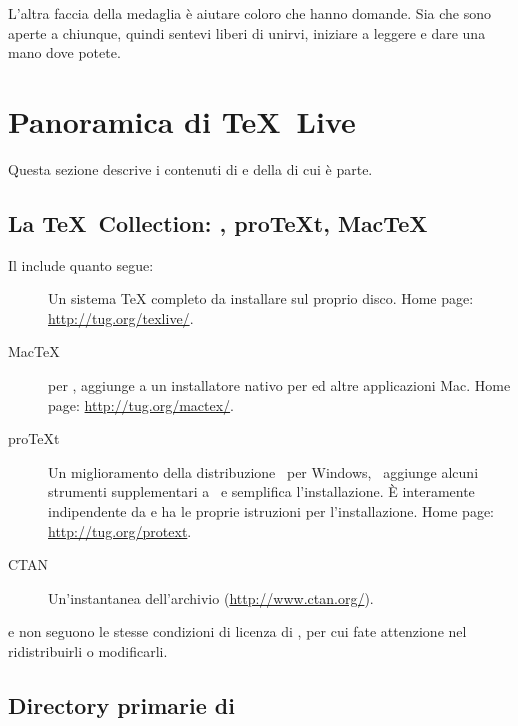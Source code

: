 \documentclass{article}
\begin{document}
L'altra faccia della medaglia è aiutare coloro che hanno domande. Sia
 che  sono aperte a chiunque, quindi
sentevi liberi di unirvi, iniziare a leggere e dare una mano dove potete.

\section{Panoramica di \protect\TeX\protect\ Live}
\label{sec:overview-tl}

Questa sezione descrive i contenuti di \TL{} e della \TK{} di cui è parte.

\subsection{La \protect\TeX\protect\ Collection: \TL, pro\TeX{}t, Mac\TeX}
\label{sec:tl-coll-dists}

Il \DVD{} \TK{} include quanto segue:

\begin{description}

\item [\TL] Un sistema \TeX{} completo da installare sul proprio disco. Home
  page: \url{http://tug.org/texlive/}.

\item [Mac\TeX] per \MacOSX, aggiunge a \TL{} un installatore nativo per \MacOSX
  ed altre applicazioni Mac. Home page: \url{http://tug.org/mactex/}.

\item [pro\TeX{}t] Un miglioramento della distribuzione \MIKTEX\ per
  Windows, \ProTeXt\ aggiunge alcuni strumenti supplementari a \MIKTEX\ e
  semplifica l'installazione. È interamente indipendente da \TL{} e ha le
  proprie istruzioni per l'installazione. Home page:
  \url{http://tug.org/protext}.  

\item [CTAN] Un'instantanea dell'archivio \CTAN{}
  (\url{http://www.ctan.org/}).

\end{description}

\CTAN{} e  non seguono le stesse condizioni di licenza di
\TL{}, per cui fate attenzione nel ridistribuirli o modificarli.


\subsection{Directory primarie di \TL{}}
\label{sec:tld}
\end{document}
